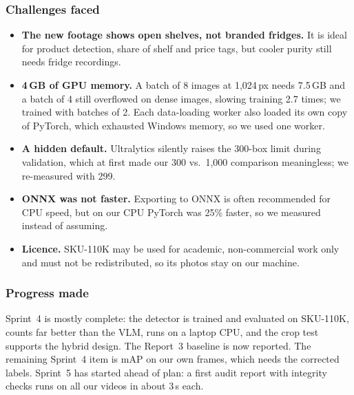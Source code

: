 \subsubsection{Challenges faced}
\begin{itemize}
  \item \textbf{The new footage shows open shelves, not branded fridges.} It is ideal for product
  detection, share of shelf and price tags, but cooler purity still needs fridge recordings.
  \item \textbf{4\,GB of GPU memory.} A batch of 8 images at 1{,}024\,px needs 7.5\,GB and a batch of
  4 still overflowed on dense images, slowing training 2.7 times; we trained with batches of 2.
  Each data-loading worker also loaded its own copy of PyTorch, which exhausted Windows memory,
  so we used one worker.
  \item \textbf{A hidden default.} Ultralytics silently raises the 300-box limit during validation,
  which at first made our 300 vs.\ 1{,}000 comparison meaningless; we re-measured with 299.
  \item \textbf{ONNX was not faster.} Exporting to ONNX is often recommended for CPU speed, but on
  our CPU PyTorch was 25\% faster, so we measured instead of assuming.
  \item \textbf{Licence.} SKU-110K may be used for academic, non-commercial work only and must not
  be redistributed, so its photos stay on our machine.
\end{itemize}

\subsubsection{Progress made}
Sprint~4 is mostly complete: the detector is trained and evaluated on SKU-110K, counts far better
than the VLM, runs on a laptop CPU, and the crop test supports the hybrid design. The Report~3
baseline is now reported. The remaining Sprint~4 item is mAP on our own frames, which needs the
corrected labels. Sprint~5 has started ahead of plan: a first audit report with integrity checks runs
on all our videos in about 3\,s each.


